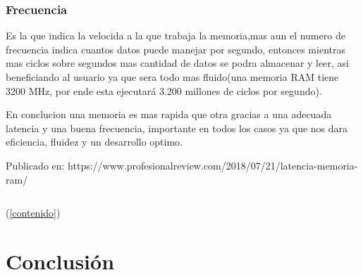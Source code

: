 \documentclass{article}
\begin{document}
    \subsubsection{Frecuencia} Es la que indica la velocida a la que trabaja la memoria,mas aun el numero de frecuencia indica cuantos datos puede manejar por segundo, entonces mientras mas ciclos sobre segundos mas cantidad de datos se podra almacenar y leer, asi beneficiando al usuario ya que sera todo mas fluido(una memoria RAM tiene 3200 MHz, por ende esta ejecutará 3.200 millones de ciclos por segundo).
    
    En conclucion una memoria es mas rapida que otra gracias a una adecuada latencia y una buena frecuencia, importante en todos los casos ya que nos dara eficiencia, fluidez y un desarrollo optimo.

Publicado en: https://www.profesionalreview.com/2018/07/21/latencia-memoria-ram/
    
    


\begin{lstlisting}

\end{lstlisting}

(\ref{contenido})

\section{Conclusión} \label{conclulsion}



\end{document}
